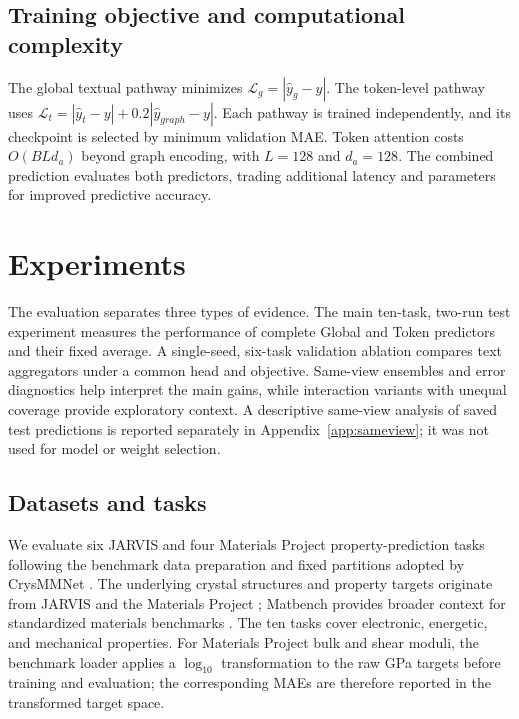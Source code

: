 \documentclass[a4paper,fleqn]{cas-sc}
\begin{document}
\subsection{Training objective and computational complexity}
The global textual pathway minimizes $\mathcal L_g=|\hat y_g-y|$. The token-level pathway uses $\mathcal L_t=|\hat y_t-y|+0.2|\hat y_{graph}-y|$. Each pathway is trained independently, and its checkpoint is selected by minimum validation MAE. Token attention costs $O(BLd_a)$ beyond graph encoding, with $L=128$ and $d_a=128$. The combined prediction evaluates both predictors, trading additional latency and parameters for improved predictive accuracy.

\FloatBarrier
\section{Experiments}
The evaluation separates three types of evidence. The main ten-task, two-run test experiment measures the performance of complete Global and Token predictors and their fixed average. A single-seed, six-task validation ablation compares text aggregators under a common head and objective. Same-view ensembles and error diagnostics help interpret the main gains, while interaction variants with unequal coverage provide exploratory context. A descriptive same-view analysis of saved test predictions is reported separately in Appendix~\ref{app:sameview}; it was not used for model or weight selection.
\subsection{Datasets and tasks}
We evaluate six JARVIS and four Materials Project property-prediction tasks following the benchmark data preparation and fixed partitions adopted by CrysMMNet \citep{das2023crysmmnet}. The underlying crystal structures and property targets originate from JARVIS and the Materials Project \citep{choudhary2020jarvis,jain2013materialsproject}; Matbench provides broader context for standardized materials benchmarks \citep{dunn2020matbench}. The ten tasks cover electronic, energetic, and mechanical properties. For Materials Project bulk and shear moduli, the benchmark loader applies a $\log_{10}$ transformation to the raw GPa targets before training and evaluation; the corresponding MAEs are therefore reported in the transformed target space.
\end{document}
